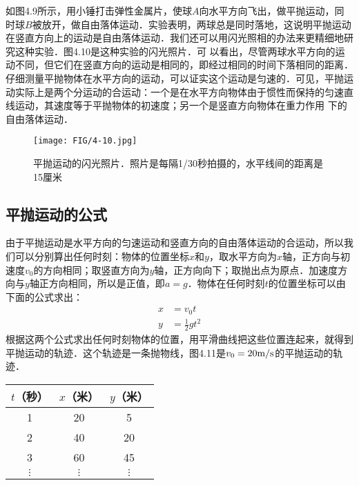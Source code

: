 如图4.9所示，用小锤打击弹性金属片，使球$A$向水平方向飞出，做平抛运动，同时球$B$被放开，做自由落体运动．实验表明，两球总是同时落地，这说明平抛运动在竖直方向上的运动是自由落体运动．我们还可以用闪光照相的办法来更精细地研究这种实验．图4.10是这种实验的闪光照片．可
以看出，尽管两球水平方向的运动不同，但它们在竖直方向的运动是相同的，即经过相同的时间下落相同的距离．仔细测量平抛物体在水平方向的运动，可以证实这个运动是匀速的．可见，平抛运动实际上是两个分运动的合运动：一个是在水平方向物体由于惯性而保持的匀速直线运动，其速度等于平抛物体的初速度；另一个是竖直方向物体在重力作用
下的自由落体运动．

\begin{figure}[htp]
    \centering
    \texttt{[image: FIG/4-10.jpg]}
    \caption{平抛运动的闪光照片．照片是每隔1/30秒拍摄的，水平线间的距离是15厘米
}
    \end{figure}

\subsection{平抛运动的公式} 

由于平抛运动是水平方向的匀速运动和竖直方向的自由落体运动的合运动，所以我们可以分别算出任何时刻：物体的位置坐标$x$和$y$，取水平方向为$x$轴，正方向与初速度$v_0$的方向相同；取竖直方向为$y$轴，正方向向下；取抛出点为原点．加速度方向与$y$轴正方向相同，所以是正值，即$a=g$．物体在任何时刻$t$的位置坐标可以由下面的公式求出：
\[\begin{split}
x&=v_0 t\\
y&=\frac{1}{2}gt^2
\end{split} \]
根据这两个公式求出任何时刻物体的位置，用平滑曲线把这些位置连起来，就得到平抛运动的轨迹．这个轨迹是一条抛物线，图4.11是$v_0=20\text{m}/\text{s}$的平抛运动的轨迹．

\begin{center}
\begin{tabular}{ccc}
\hline
$t$（秒）   &  $x$（米）   &  $y$（米）\\
\hline
1 & 20 & 5\\
2 & 40 & 20\\
3 & 60 & 45\\
$\vdots$ & $\vdots$ & $\vdots$\\
\hline
\end{tabular}
\end{center}

